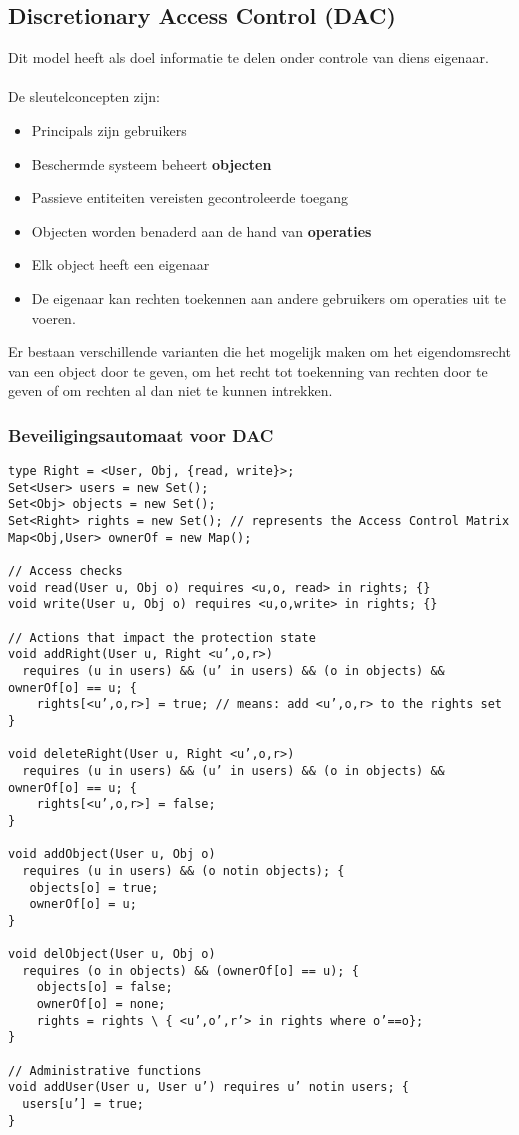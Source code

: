 \documentclass[../main.tex]{subfiles}
\begin{document}
\subsection{Discretionary Access Control (DAC)}
Dit model heeft als doel informatie te delen onder controle van diens eigenaar.
\\\\
De sleutelconcepten zijn:
\begin{multicols}{2}
\begin{itemize}
	\item Principals zijn gebruikers
	\item Beschermde systeem beheert \textbf{objecten}
	\item Passieve entiteiten vereisten gecontroleerde toegang
	\item Objecten worden benaderd aan de hand van \textbf{operaties}
	\item Elk object heeft een eigenaar
	\item De eigenaar kan rechten toekennen aan andere gebruikers om operaties uit te voeren.
\end{itemize}
\end{multicols}
\noindent
Er bestaan verschillende varianten die het mogelijk maken om het eigendomsrecht van een object door te geven, om het recht tot toekenning van rechten door te geven of om rechten al dan niet te kunnen intrekken.

\subsubsection{Beveiligingsautomaat voor DAC}
\begin{lstlisting}[caption=DAC Automaat]
type Right = <User, Obj, {read, write}>;
Set<User> users = new Set();
Set<Obj> objects = new Set();
Set<Right> rights = new Set(); // represents the Access Control Matrix
Map<Obj,User> ownerOf = new Map();

// Access checks
void read(User u, Obj o) requires <u,o, read> in rights; {}
void write(User u, Obj o) requires <u,o,write> in rights; {}

// Actions that impact the protection state
void addRight(User u, Right <u’,o,r>)
  requires (u in users) && (u’ in users) && (o in objects) && ownerOf[o] == u; {
    rights[<u’,o,r>] = true; // means: add <u’,o,r> to the rights set
}

void deleteRight(User u, Right <u’,o,r>)
  requires (u in users) && (u’ in users) && (o in objects) && ownerOf[o] == u; {
    rights[<u’,o,r>] = false;
}

void addObject(User u, Obj o)
  requires (u in users) && (o notin objects); {
   objects[o] = true;
   ownerOf[o] = u;
}

void delObject(User u, Obj o)
  requires (o in objects) && (ownerOf[o] == u); {
    objects[o] = false;
    ownerOf[o] = none;
    rights = rights \ { <u’,o’,r’> in rights where o’==o};
}

// Administrative functions
void addUser(User u, User u’) requires u’ notin users; {
  users[u’] = true;
}
\end{lstlisting}
\end{document}
